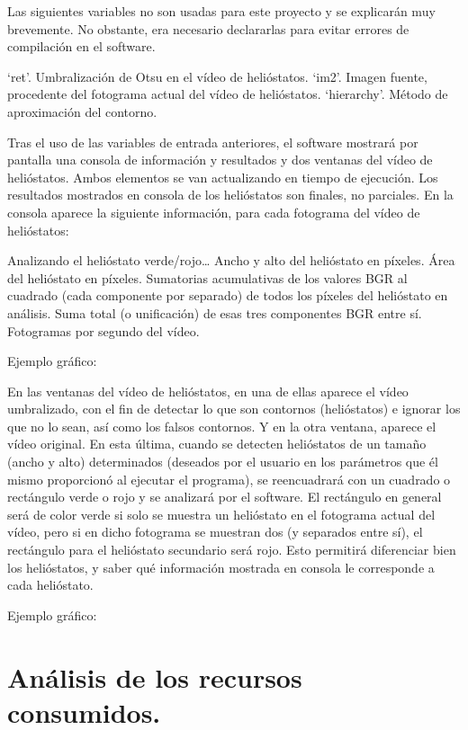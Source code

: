 \documentclass[12pt]{article}
\begin{document}
Las siguientes variables no son usadas para este proyecto y se explicarán muy brevemente. No obstante, era necesario declararlas para evitar errores de compilación en el software.

‘ret’. Umbralización de Otsu en el vídeo de helióstatos.
‘im2’. Imagen fuente, procedente del fotograma actual del vídeo de helióstatos.
‘hierarchy’. Método de aproximación del contorno.

Tras el uso de las variables de entrada anteriores, el software mostrará por pantalla una consola de información y resultados y dos ventanas del vídeo de helióstatos. Ambos elementos se van actualizando en tiempo de ejecución. Los resultados mostrados en consola de los helióstatos son finales, no parciales. En la consola aparece la siguiente información, para cada fotograma del vídeo de helióstatos:

Analizando el helióstato verde/rojo…
Ancho y alto del helióstato en píxeles.
Área del helióstato en píxeles.
Sumatorias acumulativas de los valores BGR al cuadrado (cada componente por separado) de todos los píxeles del helióstato en análisis.
Suma total (o unificación) de esas tres componentes BGR entre sí.
Fotogramas por segundo del vídeo.

Ejemplo gráfico:



En las ventanas del vídeo de helióstatos, en una de ellas aparece el vídeo umbralizado, con el fin de detectar lo que son contornos (helióstatos) e ignorar los que no lo sean, así como los falsos contornos. Y en la otra ventana, aparece el vídeo original. En esta última, cuando se detecten helióstatos de un tamaño (ancho y alto) determinados (deseados por el usuario en los parámetros que él mismo proporcionó al ejecutar el programa), se reencuadrará con un cuadrado o rectángulo verde o rojo y se analizará por el software. El rectángulo en general será de color verde si solo se muestra un helióstato en el fotograma actual del vídeo, pero si en dicho fotograma se muestran dos (y separados entre sí), el rectángulo para el helióstato secundario será rojo. Esto permitirá diferenciar bien los helióstatos, y saber qué información mostrada en consola le corresponde a cada helióstato.

Ejemplo gráfico:




\section{Análisis de los recursos consumidos.}
\end{document}
